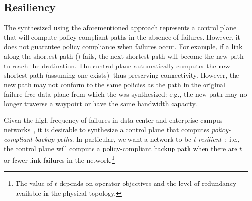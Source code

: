 \subsection{Resiliency}

%

The \ARC synthesized using the aforementioned approach represents a
control plane that will compute policy-compliant paths in the absence of
failures. However, it does not guarantee policy compliance when failures occur. For
example, if a link along the shortest path () fails, the next shortest path will become the new path to reach the
destination. The control plane automatically computes the new shortest path
(assuming one exists), thus preserving connectivity. However, the new path may
not conform to the same policies as the path in the original failure-free data
plane from which the \ARC was synthesized: e.g., the new path may no longer
traverse a waypoint or have the same bandwidth capacity.

Given the high frequency of failures in data center and enterprise campus
networks~\cite{datacenterfailures}, it is desirable to synthesize a control plane that
computes {\em policy-compliant backup paths}. In particular, we want a network
to be {\em t-resilient}~\cite{plinko}: i.e., the control plane will compute a
policy-compliant backup path when there are $t$ or fewer link failures in the
network.\footnote{The value of $t$ depends on operator objectives and the
level of redundancy available in the physical topology.}

